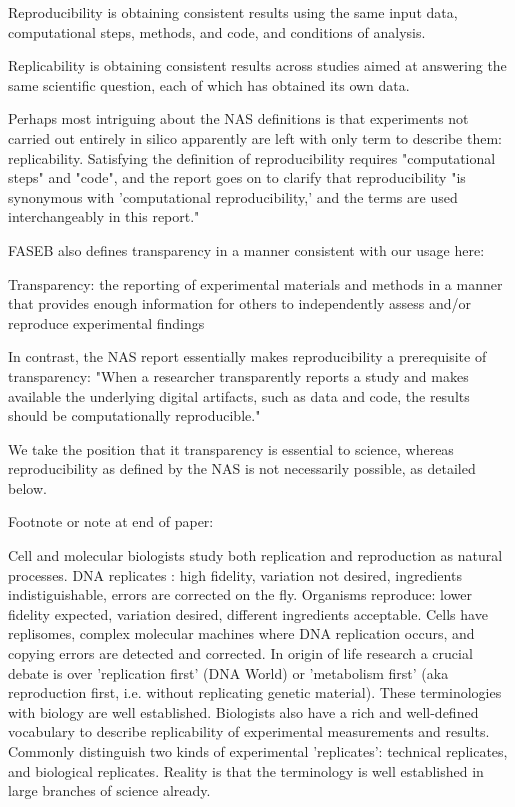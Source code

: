 Reproducibility is obtaining consistent results using the same input data, computational
	steps, methods, and code, and conditions of analysis. 

Replicability is obtaining consistent results across studies aimed at answering the same
	scientific question, each of which has obtained its own data.


Perhaps most intriguing about the NAS definitions is that experiments not carried out entirely in silico apparently are left with only term
	to describe them: replicability. Satisfying the definition of reproducibility requires "computational steps" and "code", and  
	the report goes on to clarify that reproducibility "is synonymous with 'computational reproducibility,' and the terms are
	used interchangeably in this report."

FASEB also defines transparency in a manner consistent with our usage here:

	Transparency:  the reporting of experimental materials and methods in a manner that provides enough information 
	for others to independently assess and/or reproduce experimental findings

In contrast, the NAS report essentially makes reproducibility a prerequisite of transparency: "When a researcher transparently
	reports a study and makes available the underlying digital artifacts, such as data and code, the results should be 
	computationally reproducible."   

We take the position that it transparency is essential to science, whereas reproducibility as defined by the NAS is not necessarily possible, as detailed below.

Footnote or note at end of paper:

		Cell and molecular biologists study both replication and reproduction as natural processes.
		DNA replicates :  high fidelity, variation not desired, ingredients indistiguishable, errors are corrected on the fly.
		Organisms reproduce:  lower fidelity expected, variation desired, different ingredients acceptable.
		Cells have replisomes, complex molecular machines where DNA replication occurs, and copying errors are detected and corrected.
		In origin of life research a crucial debate is over 'replication first' (DNA World) or
 					'metabolism first' (aka reproduction first, i.e. without replicating genetic material).
		These terminologies with biology are well established.
		Biologists also have a rich and well-defined vocabulary to describe replicability of experimental measurements and results.
		Commonly distinguish two kinds of experimental 'replicates':  technical replicates, and biological replicates.
 			Reality is that the terminology is well established in large branches of science already.

